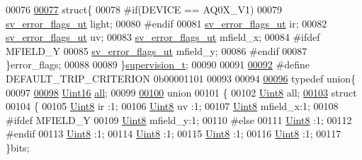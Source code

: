 \begin{DoxyCode}
00076 
\hypertarget{a00006_source_l00077}{}\hyperlink{a00006}{00077}   \textcolor{keyword}{struct}\{
00078 \textcolor{preprocessor}{#if(DEVICE == AQ0X\_V1)}
00079    \hyperlink{a00006_d1/da8/a00230}{sv\_error\_flags\_ut}        light;
00080 \textcolor{preprocessor}{#endif}
00081    \hyperlink{a00006_d1/da8/a00230}{sv\_error\_flags\_ut}        ir;
00082    \hyperlink{a00006_d1/da8/a00230}{sv\_error\_flags\_ut}        uv;
00083    \hyperlink{a00006_d1/da8/a00230}{sv\_error\_flags\_ut}        mfield\_x;
00084 \textcolor{preprocessor}{#ifdef MFIELD\_Y}
00085    \hyperlink{a00006_d1/da8/a00230}{sv\_error\_flags\_ut}        mfield\_y;
00086 \textcolor{preprocessor}{#endif}
00087   \}error\_flags;
00088 
00089 \}\hyperlink{a00006_de/dc2/a00228}{supervision\_t};
00090 
00091 
\hypertarget{a00006_source_l00092}{}\hyperlink{a00006_a0ff9495f8521ea7698e83e7b4d6a6985}{00092} \textcolor{preprocessor}{#define DEFAULT\_TRIP\_CRITERION   0b00001101}
00093 
00094 
\hypertarget{a00006_source_l00096}{}\hyperlink{a00006}{00096} \textcolor{keyword}{typedef}  \textcolor{keyword}{union}\{
00097 
\hypertarget{a00006_source_l00098}{}\hyperlink{a00006_a3a4ea34ff84a869fc06d5088774a23dd}{00098}     \hyperlink{a00004_aae7407b021d43f7193a81a58cfb3e297}{Uint16} \hyperlink{a00006_a3a4ea34ff84a869fc06d5088774a23dd}{all};
00099 
\hypertarget{a00006_source_l00100}{}\hyperlink{a00006}{00100}     \textcolor{keyword}{union}
00101     \{
00102         \hyperlink{a00004_a979e3e23b9a449e69ab6a8a83b6042f8}{Uint8} all;
\hypertarget{a00006_source_l00103}{}\hyperlink{a00006}{00103}         \textcolor{keyword}{struct}
00104         \{
00105             \hyperlink{a00004_a979e3e23b9a449e69ab6a8a83b6042f8}{Uint8} ir      :1;
00106             \hyperlink{a00004_a979e3e23b9a449e69ab6a8a83b6042f8}{Uint8} uv      :1;
00107             \hyperlink{a00004_a979e3e23b9a449e69ab6a8a83b6042f8}{Uint8} mfield\_x:1;
00108 \textcolor{preprocessor}{            #ifdef MFIELD\_Y}
00109             \hyperlink{a00004_a979e3e23b9a449e69ab6a8a83b6042f8}{Uint8} mfield\_y:1;
00110 \textcolor{preprocessor}{            #else}
00111             \hyperlink{a00004_a979e3e23b9a449e69ab6a8a83b6042f8}{Uint8}         :1;
00112 \textcolor{preprocessor}{            #endif}
00113             \hyperlink{a00004_a979e3e23b9a449e69ab6a8a83b6042f8}{Uint8}         :1;
00114             \hyperlink{a00004_a979e3e23b9a449e69ab6a8a83b6042f8}{Uint8}         :1;
00115             \hyperlink{a00004_a979e3e23b9a449e69ab6a8a83b6042f8}{Uint8}         :1;
00116             \hyperlink{a00004_a979e3e23b9a449e69ab6a8a83b6042f8}{Uint8}         :1;
00117         \}bits;

\end{DoxyCode}
